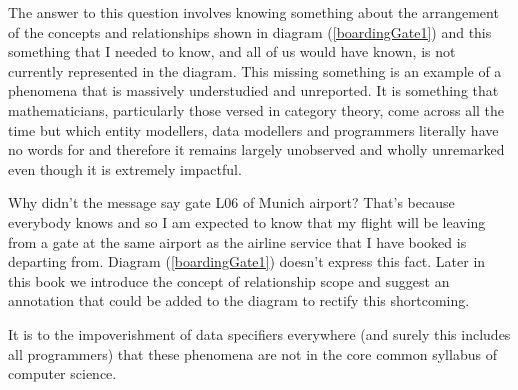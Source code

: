\mynote The answer to this question involves knowing something about the arrangement
of the concepts and relationships shown in diagram (\ref{boardingGate1}) 
and this something that I needed to know, 
and all of us would have known,
is not currently represented in the diagram.  
This missing something is an example of a phenomena  
that is massively understudied and unreported. It is something that mathematicians, particularly those versed in category theory, come across all the time but which entity modellers, data modellers and programmers literally have no words for and therefore it remains largely unobserved and wholly unremarked even though it is extremely impactful.

\mynote 
Why didn't the message say gate L06 of Munich airport?
That's because everybody knows and so I am expected to know that my flight will be leaving from a gate at the same airport as the airline service that I have booked is departing from. 
Diagram (\ref{boardingGate1}) doesn't express this fact. 
Later in this book we introduce the concept of relationship scope and 
suggest an annotation that could be added to the diagram to rectify this shortcoming.

It is to the impoverishment of data specifiers everywhere (and surely this includes all programmers) that these phenomena are not in the core common syllabus of computer science. 

